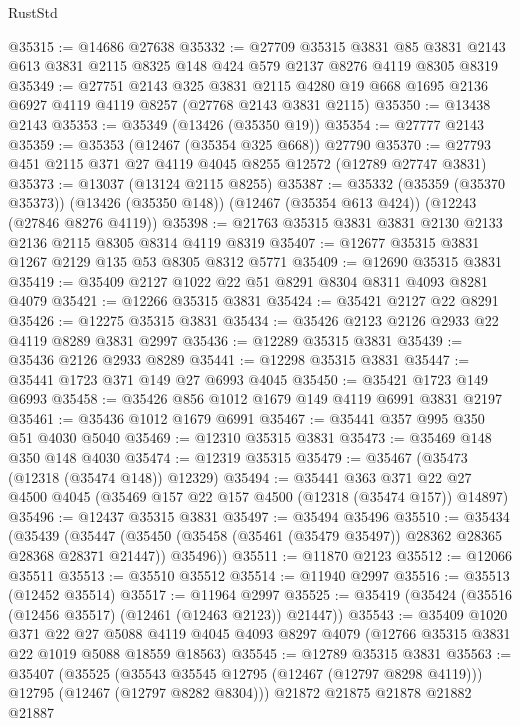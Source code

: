 \begin{lexlean}{RustStd}
\begin{coremodule}
@35315 := @14686 @27638
@35332 := @27709
    @35315
    @3831
    @85
    @3831
    @2143
    @613
    @3831
    @2115
    @8325
    @148
    @424
    @579
    @2137
    @8276
    @4119
    @8305
    @8319
@35349 := @27751
    @2143
    @325
    @3831
    @2115
    @4280
    @19
    @668
    @1695
    @2136
    @6927
    @4119
    @4119
    @8257
    (@27768 @2143 @3831 @2115)
@35350 := @13438 @2143
@35353 := @35349 (@13426 (@35350 @19))
@35354 := @27777 @2143
@35359 := @35353 (@12467 (@35354 @325 @668)) @27790
@35370 := @27793 @451 @2115 @371 @27 @4119 @4045 @8255 @12572 (@12789 @27747 @3831)
@35373 := @13037 (@13124 @2115 @8255)
@35387 := @35332
    (@35359 (@35370 @35373))
    (@13426 (@35350 @148))
    (@12467 (@35354 @613 @424))
    (@12243 (@27846 @8276 @4119))
@35398 := @21763 @35315 @3831 @3831 @2130 @2133 @2136 @2115 @8305 @8314 @4119 @8319
@35407 := @12677 @35315 @3831 @1267 @2129 @135 @53 @8305 @8312 @5771
@35409 := @12690 @35315 @3831
@35419 := @35409 @2127 @1022 @22 @51 @8291 @8304 @8311 @4093 @8281 @4079
@35421 := @12266 @35315 @3831
@35424 := @35421 @2127 @22 @8291
@35426 := @12275 @35315 @3831
@35434 := @35426 @2123 @2126 @2933 @22 @4119 @8289 @3831 @2997
@35436 := @12289 @35315 @3831
@35439 := @35436 @2126 @2933 @8289
@35441 := @12298 @35315 @3831
@35447 := @35441 @1723 @371 @149 @27 @6993 @4045
@35450 := @35421 @1723 @149 @6993
@35458 := @35426 @856 @1012 @1679 @149 @4119 @6991 @3831 @2197
@35461 := @35436 @1012 @1679 @6991
@35467 := @35441 @357 @995 @350 @51 @4030 @5040
@35469 := @12310 @35315 @3831
@35473 := @35469 @148 @350 @148 @4030
@35474 := @12319 @35315
@35479 := @35467 (@35473 (@12318 (@35474 @148)) @12329)
@35494 := @35441
    @363
    @371
    @22
    @27
    @4500
    @4045
    (@35469 @157 @22 @157 @4500 (@12318 (@35474 @157)) @14897)
@35496 := @12437 @35315 @3831
@35497 := @35494 @35496
@35510 := @35434
    (@35439
      (@35447 (@35450 (@35458 (@35461 (@35479 @35497)) @28362 @28365 @28368 @28371 @21447)) @35496))
@35511 := @11870 @2123
@35512 := @12066 @35511
@35513 := @35510 @35512
@35514 := @11940 @2997
@35516 := @35513 (@12452 @35514)
@35517 := @11964 @2997
@35525 := @35419 (@35424 (@35516 (@12456 @35517) (@12461 (@12463 @2123)) @21447))
@35543 := @35409
    @1020
    @371
    @22
    @27
    @5088
    @4119
    @4045
    @4093
    @8297
    @4079
    (@12766 @35315 @3831 @22 @1019 @5088 @18559 @18563)
@35545 := @12789 @35315 @3831
@35563 := @35407
    (@35525
      (@35543 @35545 @12795 (@12467 (@12797 @8298 @4119)))
      @12795
      (@12467 (@12797 @8282 @8304)))
    @21872
    @21875
    @21878
    @21882
    @21887

\end{coremodule}
\end{lexlean}

